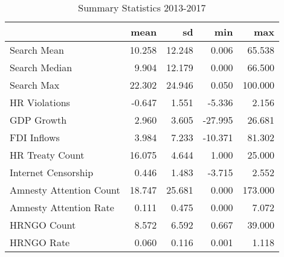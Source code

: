 \begin{table}[ht]
\centering
\begin{tabular}{|l|rrrr|}
  \hline
 & mean & sd & min & max \\ 
  \hline
Search Mean & 10.258 & 12.248 & 0.006 & 65.538 \\ 
  Search Median & 9.904 & 12.179 & 0.000 & 66.500 \\ 
  Search Max & 22.302 & 24.946 & 0.050 & 100.000 \\ 
  HR Violations & -0.647 & 1.551 & -5.336 & 2.156 \\ 
  GDP Growth & 2.960 & 3.605 & -27.995 & 26.681 \\ 
  FDI Inflows & 3.984 & 7.233 & -10.371 & 81.302 \\ 
  HR Treaty Count & 16.075 & 4.644 & 1.000 & 25.000 \\ 
  Internet Censorship & 0.446 & 1.483 & -3.715 & 2.552 \\ 
  Amnesty Attention Count & 18.747 & 25.681 & 0.000 & 173.000 \\ 
  Amnesty Attention Rate & 0.111 & 0.475 & 0.000 & 7.072 \\ 
  HRNGO Count & 8.572 & 6.592 & 0.667 & 39.000 \\ 
  HRNGO Rate & 0.060 & 0.116 & 0.001 & 1.118 \\ 
   \hline
\end{tabular}
\caption{Summary Statistics 2013-2017} 
\end{table}
